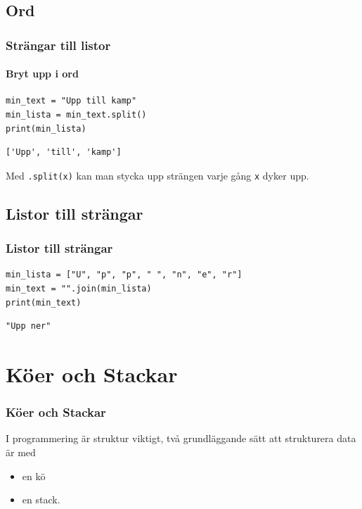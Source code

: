 \documentclass[aspectratio=169]{beamer}
\newcommand{\code}[1]{\colorbox{white}{\lstinline{#1}}}
\begin{document}
\subsection{Ord}

\begin{frame}[fragile]
	\frametitle{Strängar till listor}
	\framesubtitle{Bryt upp i ord}
	
	\begin{lstlisting}
min_text = "Upp till kamp"
min_lista = min_text.split()
print(min_lista)
	\end{lstlisting}
	
	\pause
	
	\begin{lstlisting}
['Upp', 'till', 'kamp']
	\end{lstlisting}
	
	Med \code{.split(x)} kan man stycka upp strängen varje gång \code{x} dyker upp.
	
\end{frame}

\subsection{Listor till strängar}

\begin{frame}[fragile]
	\frametitle{Listor till strängar}
	
	\begin{lstlisting}
min_lista = ["U", "p", "p", " ", "n", "e", "r"]
min_text = "".join(min_lista)
print(min_text)
	\end{lstlisting}
	
	\pause
	
	\begin{lstlisting}
"Upp ner"
	\end{lstlisting}
	
\end{frame}



\section{Köer och Stackar}

\begin{frame}
	\frametitle{Köer och Stackar}
	
	I programmering är struktur viktigt, två grundläggande sätt att strukturera data är med
	
	\begin{itemize}
		\item en kö
		\item en stack.
	\end{itemize}
	
	
	
\end{frame}
\end{document}
